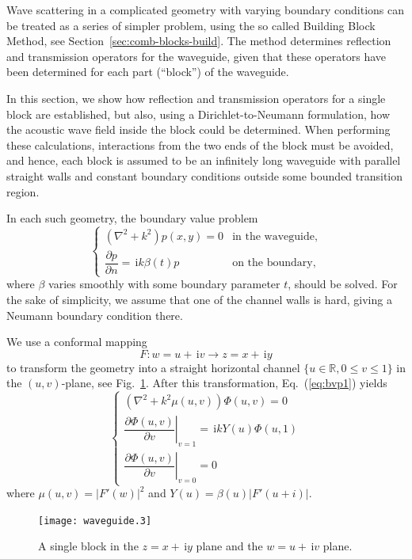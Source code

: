 \documentclass[numreferences]{kluwer}
\providecommand{\abs}[1]{\left\lvert#1\right\rvert}
\renewcommand{\Phi}{\varPhi}
\renewcommand{\i}{\,\mathrm{i}}
\newcommand{\R}{\mathbb R}
\newcommand{\pd}[2]{\dfrac{\partial#1}{\partial#2}}
\renewcommand{\Phi}{\varPhi}
\begin{document}
Wave scattering in a complicated geometry with varying boundary
conditions can be treated as a series of simpler problem, using the so
called Building Block Method, see
Section~\ref{sec:comb-blocks-build}. The method determines reflection
and transmission operators for the waveguide, given that these
operators have been determined for each part (``block'') of the
waveguide. 

In this section, we show how reflection and transmission operators for
a single block are established, but also, using a Dirichlet-to-Neumann
formulation, how the acoustic wave field inside the block could be
determined.  When performing these calculations, interactions from the
two ends of the block must be avoided, and hence, each block is
assumed to be an infinitely long waveguide with parallel straight
walls and constant boundary conditions outside some bounded transition
region.

In each such geometry, the boundary value problem
\begin{equation}
  \label{eq:bvp1}
  \begin{cases}
    \left(\nabla^2+k^2\right)p(x,y)=0&\text{in the waveguide,}\\[1ex]
    \pd pn=\i k\beta(t)p&\text{on the boundary,}
  \end{cases}
\end{equation}
where $\beta$ varies smoothly with some boundary parameter $t$, should
be solved. For the sake of simplicity, we assume that one of the
channel walls is hard, giving a Neumann boundary condition there.

We use a conformal mapping
\begin{equation*}
  F:w=u+\i v\to z=x+\i y
\end{equation*}
to transform the geometry into a straight horizontal channel
\mbox{$\{u\in\R,0\le v\le1\}$} in the $(u,v)$-plane, see
Fig.~\ref{fig:confmap}. After this transformation, Eq.~(\ref{eq:bvp1})
yields
\begin{equation}
  \label{eq:bvp2}
  \begin{cases}
    \left(\nabla^2+k^2\mu(u,v)\right)\Phi(u,v)=0\\[1ex]
    \left.\pd{\Phi(u,v)}v\right|_{v=1}=\i kY(u)\Phi(u,1)\\[1.5ex]
    \left.\pd{\Phi(u,v)}v\right|_{v=0}=0
  \end{cases}
\end{equation}
where $\mu(u,v)=\abs{F'(w)}^2$ and $Y(u)=\beta(u)\abs{F'(u+i)}$.
\begin{figure}[htb]
  \centering
  \texttt{[image: waveguide.3]}
  \caption{A single block in the $z=x+\i y$ plane and the $w=u+\i v$
    plane.}
  \label{fig:confmap}
\end{figure}
\end{document}

